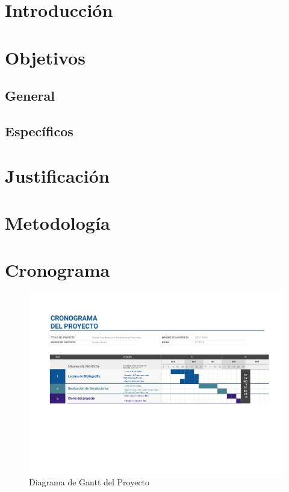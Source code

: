 
\section{Introducción}

\section{Objetivos}
\subsection{General}
\subsection{Específicos}



\section{Justificación}






\section{Metodología}




\section{Cronograma}


\begin{figure}[H]
	\centering
	\includegraphics[scale=0.63]{./img/diagramaGantt.pdf}
	\caption{Diagrama de Gantt del Proyecto}
	\label{gantt}
\end{figure}












